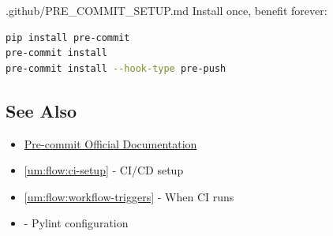 \begin{relocated}{.github/PRE_COMMIT_SETUP.md}
Install once, benefit forever:

\begin{lstlisting}[language=bash]
pip install pre-commit
pre-commit install
pre-commit install --hook-type pre-push
\end{lstlisting}

\subsection{See Also}\label{um:flow:pre-commit-setup:see-also}

\begin{itemize}
\tightlist
\item
  \href{https://pre-commit.com/}{Pre-commit Official Documentation}
\item
  \cref{um:flow:ci-setup} - CI/CD setup
\item
  \cref{um:flow:workflow-triggers} - When CI runs
\item
   - Pylint configuration
\end{itemize}
\end{relocated}

